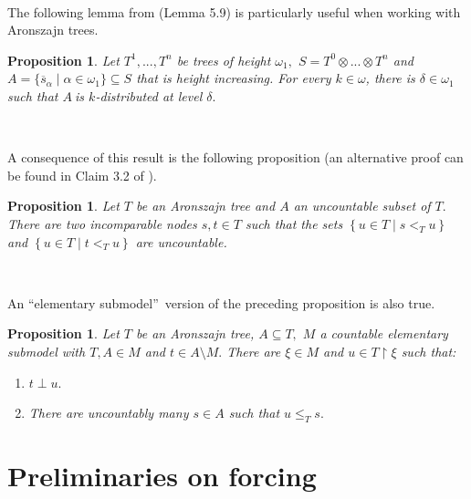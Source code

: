 \documentclass{article}
\newtheorem{proposition}[theorem]{Proposition}
\begin{document}
\qquad\ \ \ \ \ \ \ \ 

The following lemma from \cite{StevoHandbook} (Lemma 5.9) is particularly
useful when working with Aronszajn trees.

\begin{proposition}
Let $T^{1},...,T^{n}$ be trees of height $\omega_{1},$ $S=T^{0}\otimes
...\otimes T^{n}$ and $A=\{\overline{s}_{\alpha}\mid\alpha\in\omega
_{1}\}\subseteq S$ that is height increasing. For every $k\in\omega$, there is
$\delta\in\omega_{1}$ such that $A\ $is $k$-distributed at level $\delta
.$\label{Prop Aronszajn distribuido}
\end{proposition}

\qquad\ \qquad\ \qquad\ \ 

A consequence of this result is the following proposition (an alternative
proof can be found in Claim 3.2 of \cite{RectangleRefiningProperty}).

\begin{proposition}
Let $T$ be an Aronszajn tree and $A$ an uncountable subset of $T.$ There are
two incomparable nodes $s,t\in T$ such that the sets $\left\{  u\in T\mid
s<_{T}u\right\}  $ and $\left\{  u\in T\mid t<_{T}u\right\}  $ are
uncountable. \label{Prop Aronszajn no numerable}
\end{proposition}

\qquad\qquad\ \ \qquad\ \ \ 

An \textquotedblleft elementary submodel\textquotedblright\ version of the
preceding proposition is also true.

\begin{proposition}
Let $T$ be an Aronszajn tree, $A\subseteq T,$ $M$ a countable elementary
submodel with $T,A\in M$ and $t\in A\setminus M.$ There are $\xi\in M$ and
$u\in T\upharpoonright\xi$ such that: \label{Prop Aronszajn y submodelo}

\begin{enumerate}
\item $t\perp u.$

\item There are uncountably many $s\in A$ such that $u\leq_{T}s.$
\end{enumerate}
\end{proposition}

\section{Preliminaries on forcing}
\end{document}
